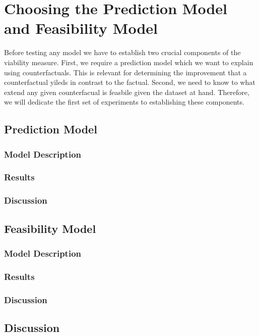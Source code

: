 \documentclass[./../../paper.tex]{subfiles}
\begin{document}
\section{Choosing the Prediction Model and Feasibility Model}
Before testing any model we have to establish two crucial components of the viability measure. First, we require a prediction model which we want to explain using counterfactuals. This is relevant for determining the improvement that a counterfactual yileds in contrast to the factual. Second, we need to know to what extend any given counterfacual is feasbile given the dataset at hand. Therefore, we will dedicate the first set of experiments to establishing these components.

\subsection{Prediction Model}
\subsubsection{Model Description}
\subsubsection{Results}
\subsubsection{Discussion}

\subsection{Feasibility Model}
\subsubsection{Model Description}
\subsubsection{Results}
\subsubsection{Discussion}

\subsection{Discussion}
 
\end{document}
